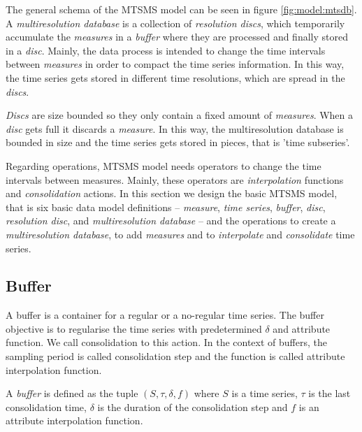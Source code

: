 The general schema of the MTSMS model can be seen in figure
\ref{fig:model:mtsdb}.  A \emph{multiresolution database} is a
collection of \emph{resolution discs}, which temporarily accumulate
the \emph{measures} in a \emph{buffer} where they are processed and
finally stored in a \emph{disc}. Mainly, the data process is intended
to change the time intervals between \emph{measures} in order to
compact the time series information. In this way, the time series gets
stored in different time resolutions, which are spread in the
\emph{discs}.

\emph{Discs} are size bounded so they only contain a fixed amount of
\emph{measures}. When a \emph{disc} gets full it discards a
\emph{measure}. In this way, the multiresolution database is bounded
in size and the time series gets stored in pieces, that is 'time
subseries'.




Regarding operations, MTSMS model needs operators to change the time
intervals between measures. Mainly, these operators are
\emph{interpolation} functions and \emph{consolidation} actions. In
this section we design the basic MTSMS model, that is six basic data
model definitions -- \emph{measure}, \emph{time series},
\emph{buffer}, \emph{disc}, \emph{resolution disc}, and
\emph{multiresolution database} -- and the operations to create a
\emph{multiresolution database}, to add \emph{measures} and to
\emph{interpolate} and \emph{consolidate} time series.






\subsection{Buffer}\label{sec:model:buffer}

A buffer is a container for a regular or a no-regular time series. The
buffer objective is to regularise the time series with predetermined $\delta$ 
and attribute function. We call consolidation to this action. In the context
of buffers, the sampling period is called consolidation step
and the function is called attribute interpolation function.

\begin{definition}[Buffer]
  A \emph{buffer} is defined as the tuple $(S,\tau,\delta,f)$ where
  $S$ is a time series, $\tau$ is the last consolidation time, $\delta$
  is the duration of the consolidation step and $f$ is an
  attribute interpolation function.
\end{definition}


